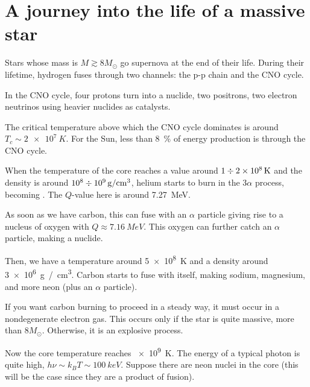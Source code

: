 \documentclass[main.tex]{subfiles}
\begin{document}
\section{A journey into the life of a massive star}


Stars whose mass is \(M \gtrsim 8 M_{\odot}\) go supernova at the end of their life. 
During their lifetime, hydrogen fuses through two channels: the p-p chain and the CNO cycle. 

In the CNO cycle, four protons turn into a  nuclide, two positrons, two electron neutrinos using heavier nuclides as catalysts. 

The critical temperature above which the CNO cycle dominates is around \(T_c \sim \SI{2e7}{K}\). For the Sun, less than \SI{8}{\percent} of energy production is through the CNO cycle. 

When the temperature of the core reaches a value around \(1 \divisionsymbol\SI{2e8}{K}\) and the density is around \(\num{e8} \divisionsymbol \SI{e9}{g / cm^3}\), helium starts to burn in the \(3 \alpha \) process, becoming . 
The \(Q\)-value here is around \SI{7.27}{MeV}.

As soon as we have carbon, this can fuse with an \(\alpha \) particle giving rise to a nucleus of oxygen with \(Q \approx \SI{7.16}{MeV}\). 
This oxygen can further catch an \(\alpha \) particle, making a  nuclide. 

Then, we have a temperature around \SI{5e8}{K} and a density around \SI{3e6}{g / cm^3}. Carbon starts to fuse with itself, making sodium, magnesium, and more neon (plus an \(\alpha \) particle). 

If you want carbon burning to proceed in a steady way, it must occur in a nondegenerate electron gas.
This occurs only if the star is quite massive, more than \(8 M_{\odot}\). Otherwise, it is an explosive process. 

Now the core temperature reaches \SI{e9}{K}. The energy of a typical photon is quite high, \(h \nu \sim k_B T \sim \SI{100}{keV}\). 
Suppose there are neon nuclei in the core (this will be the case since they are a product of fusion). 
\end{document}
